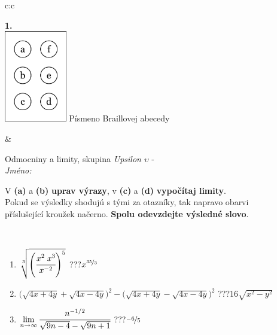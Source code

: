 \documentclass[10pt]{report}
\begin{document}
\begin{tabular}{c:c}
\begin{minipage}[c][104.5mm][t]{0.5\linewidth}
\begin{center}
\begin{minipage}{0.20\linewidth}
\begin{center}
{\Huge\bfseries 1.} \\[2mm]
\includegraphics[height=40mm]{../images/braille.png}
{\small Písmeno Braillovej abecedy}
\end{center}
\end{minipage}
\end{center}
\end{minipage}
&
\begin{minipage}[c][104.5mm][t]{0.5\linewidth}
\begin{center}
\vspace{7mm}
{\huge Odmocniny a limity, skupina \textit{Upsilon $\upsilon$} -}\\[5mm]
\textit{Jméno:}\phantom{xxxxxxxxxxxxxxxxxxxxxxxxxxxxxxxxxxxxxxxxxxxxxxxxxxxxxxxxxxxxxxxxx}\\[5mm]
\begin{minipage}{0.95\linewidth}
\begin{center}
V \textbf{(a)} a \textbf{(b)} \textbf{uprav výrazy}, v \textbf{(c)} a \textbf{(d)} \textbf{vypočítaj limity}.\\Pokud se výsledky shodujú s tými za otazníky, tak napravo obarvi\\příslušející kroužek načerno. \textbf{Spolu odevzdejte výsledné slovo}.
\end{center}
\end{minipage}
\\[1mm]
\begin{minipage}{0.79\linewidth}
\begin{center}
\begin{varwidth}{\linewidth}
\begin{enumerate}
\small
\item $\sqrt[3]{\left(\cfrac{x^{2}\;x^{3}}{x^{-2}}\right)^{5}}$\quad \dotfill\; ???\;\dotfill \quad $x^{\nicefrac{35}{3}}$
\item {\footnotesize{\scriptsize$\big(\sqrt{4x+4y}+\sqrt{4x-4y}\big)^2-\big(\sqrt{4x+4y}-\sqrt{4x-4y}\big)^2$}\quad \dotfill\; ???\;\dotfill \quad $16\sqrt{x^2-y^2}$}
\item $\lim\limits_{n\to\infty}\cfrac{n^{-1/2}}{\sqrt{9n-4}-\sqrt{9n+1}}$\quad \dotfill\; ???\;\dotfill \quad $\nicefrac{-6}{5}$

\end{enumerate}
\end{varwidth}
\end{center}
\end{minipage}
\end{center}
\end{minipage}
\end{tabular}
\end{document}
